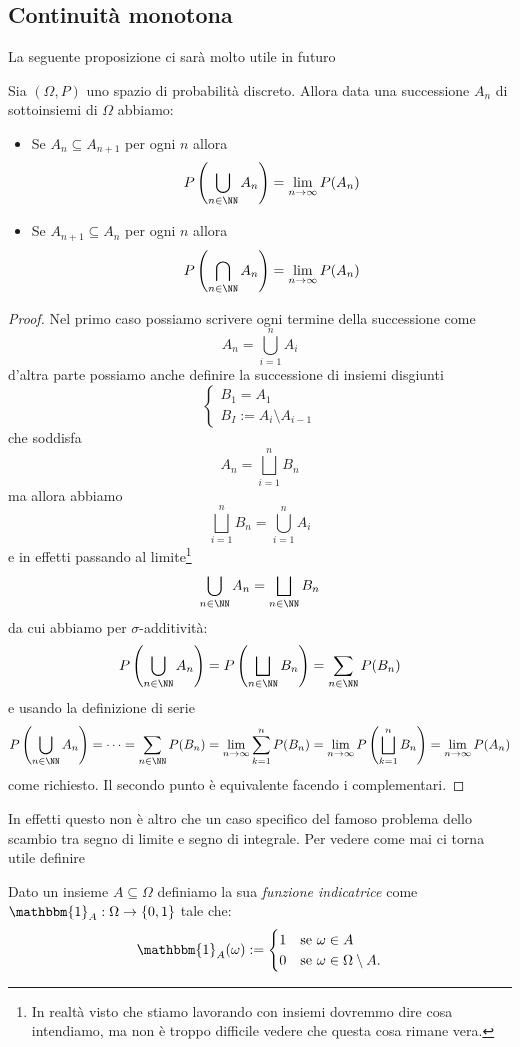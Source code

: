 \documentclass[11pt]{scrartcl}
\begin{document}
	\subsection{Continuità monotona}
	La seguente proposizione ci sarà molto utile in futuro
	\begin{theorem}
		Sia $(\Omega,P)$ uno spazio di probabilità discreto. Allora data una successione $A_n$ di sottoinsiemi di $\Omega$ abbiamo:
		\begin{itemize}
			\item Se $A_n\subseteq A_{n+1}$ per ogni $n$ allora
			$$P\left(\bigcup_{n\in\NN}A_n \right)=\lim_{n\to\infty}P(A_n)$$
			\item Se $A_{n+1}\subseteq A_n$ per ogni $n$ allora
			$$P\left(\bigcap_{n\in\NN}A_n\right)=\lim_{n\to\infty}P(A_n)$$
		\end{itemize}
	\end{theorem}
	\begin{proof}
		Nel primo caso possiamo scrivere ogni termine della successione come
		$$A_n=\bigcup_{i=1}^{n}A_i$$
		d'altra parte possiamo anche definire la successione di insiemi disgiunti
		$$
		\begin{cases}
			B_1=A_1 \\
			B_I:=A_i\setminus A_{i-1}
		\end{cases}
		$$
		che soddisfa
		$$A_n= \bigsqcup_{i=1}^n B_n$$
		ma allora abbiamo 
		$$\bigsqcup_{i=1}^n B_n=\bigcup_{i=1}^{n}A_i$$ 
		e in effetti passando al limite\footnote{In realtà visto che stiamo lavorando con insiemi dovremmo dire cosa intendiamo, ma non è troppo difficile vedere che questa cosa rimane vera.} 
		$$\bigcup_{n\in \NN}A_n=\bigsqcup_{n\in\NN} B_n$$
		da cui abbiamo per $\sigma$-additività: 
		$$P\left(\bigcup_{n\in \NN}A_n\right)=P\left(\bigsqcup_{n\in\NN} B_n\right)=\sum_{n\in \NN}P(B_n)$$
		e usando la definizione di serie
		$$P\left(\bigcup_{n\in \NN}A_n\right)=\dots=\sum_{n\in \NN}P(B_n)=\lim_{n\to\infty}\sum_{k=1}^{n}P(B_n)=\lim_{n\to \infty}P\left(\bigsqcup_{k=1}^n B_n\right)=\lim_{n\to\infty}P(A_n)$$
		come richiesto. Il secondo punto è equivalente facendo i complementari.
	\end{proof}
	In effetti questo non è altro che un caso specifico del famoso problema dello scambio tra segno di limite e segno di integrale. Per vedere come mai ci torna utile definire 
	\begin{definition}
		Dato un insieme $A\subseteq \Omega$ definiamo la sua \textit{funzione indicatrice} come $\mathbbm{1}_A:\Omega\to \left\{0,1\right\}$ tale che:
		$$\mathbbm{1}_A(\omega):=
		\begin{cases}
			1 & \text{se $\omega\in A$} \\
			0 & \text{se $\omega\in \Omega\setminus A$}.
		\end{cases}$$
	\end{definition}
\end{document}
